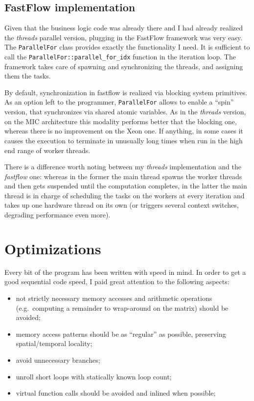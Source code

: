 \documentclass[a4paper,11pt]{article}
\newcommand{\code}[1]{\texttt{#1}}
\def\+{\discretionary{}{}{}}
\begin{document}
\subsection{FastFlow implementation}

Given that the business logic code was already there and I had already realized the \emph{threads} parallel version, plugging in the FastFlow framework was very easy. The \code{ParallelFor} class provides exactly the functionality I need. It is sufficient to call the \code{ParallelFor::\+parallel\_for\_idx} function in the iteration loop. The framework takes care of spawning and synchronizing the threads, and assigning them the tasks.

By default, synchronization in fastflow is realized via blocking system primitives. As an option left to the programmer, \code{ParallelFor} allows to enable a ``spin'' version, that synchronizes via shared atomic variables. As in the \emph{threads} version, on the MIC architecture this modality performs better that the blocking one, whereas there is no improvement on the Xeon one. If anything, in some cases it causes the execution to terminate in unusually long times when run in the high end range of worker threads.

There is a difference worth noting between my \emph{threads} implementation and the \emph{fastflow} one: whereas in the former the main thread spawns the worker threads and then gets suspended until the computation completes, in the latter the main thread is in charge of scheduling the tasks on the workers at every iteration and takes up one hardware thread on its own (or triggers several context switches, degrading performance even more).

\section{Optimizations}

Every bit of the program has been written with speed in mind. In order to get a good sequential code speed, I paid great attention to the following aspects:
\begin{itemize}
\item not strictly necessary memory accesses and arithmetic operations (e.g.\ computing a remainder to wrap-around on the matrix) should be avoided;
\item memory access patterns should be as ``regular'' as possible, preserving spatial/temporal locality;
\item avoid unnecessary branches;
\item unroll short loops with statically known loop count;
\item virtual function calls should be avoided and inlined when possible;
\end{itemize}
\end{document}
